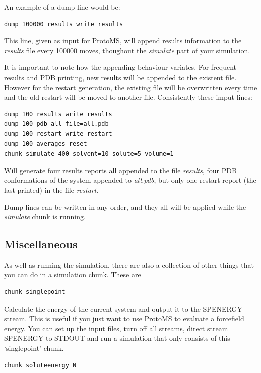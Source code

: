\documentclass[letterpaper,10pt,english]{manual}
\begin{document}
An example of a dump line would be:

\begin{Verbatim}[commandchars=@\[\]]
dump 100000 results write results
\end{Verbatim}

This line, given as input for ProtoMS, will append results information to the \emph{results} file every 100000 moves, thoughout the \emph{simulate} part of your simulation.

It is important to note how the appending behaviour variates. For frequent results and PDB printing, new results will be appended to the existent file. However for the restart generation, the existing file will be overwritten every time and the old restart will be moved to another file. Consistently these imput lines:

\begin{Verbatim}[commandchars=@\[\]]
dump 100 results write results
dump 100 pdb all file=all.pdb
dump 100 restart write restart
dump 100 averages reset
chunk simulate 400 solvent=10 solute=5 volume=1
\end{Verbatim}

Will generate four results reports all appended to the file \emph{results}, four PDB conformations of the system appended to \emph{all.pdb}, but only one restart report (the last printed) in the file \emph{restart}.

Dump lines can be written in any order, and they all will be applied while the \emph{simulate} chunk is running.
\hypertarget{misccmd}{}

\subsection{Miscellaneous}

As well as running the simulation, there are also a collection of other things that you can do in a simulation chunk. These are
\begin{Verbatim}[commandchars=@\[\]]
chunk singlepoint
\end{Verbatim}

Calculate the energy of the current system and output it to the SPENERGY stream. This is useful if you just want to use ProtoMS to evaluate a forcefield energy. You can set up the input files, turn off all streams, direct stream SPENERGY to STDOUT and run a simulation that only consists of this ‘singlepoint’ chunk.
\begin{Verbatim}[commandchars=@\[\]]
chunk soluteenergy N
\end{Verbatim}
\end{document}
